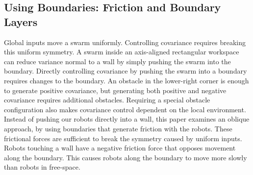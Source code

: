 %


\subsection{Using Boundaries: Friction and Boundary Layers}\label{subsec:WallFriction}
Global inputs move a swarm uniformly.  
Controlling covariance requires breaking this uniform symmetry.  A swarm inside an axis-aligned rectangular workspace can reduce variance normal to a wall by simply pushing the swarm into the boundary. Directly controlling covariance by pushing the swarm into a boundary requires changes to the boundary.  An obstacle in the lower-right corner is enough to generate positive covariance, but generating both positive and negative covariance requires additional obstacles.  Requiring a special obstacle configuration also makes covariance control dependent on the local environment. 
  Instead of pushing our robots directly into a wall, this paper examines an oblique approach, by using boundaries that generate friction with the robots.  These frictional forces are  sufficient to break the symmetry caused by uniform inputs.  Robots touching a wall have a negative friction force that opposes movement along the boundary.  This  causes robots along the boundary to move more slowly than robots in free-space. 
  
